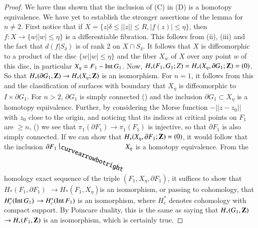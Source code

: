 \begin{proof}
We have thus shown that the inclusion of (C) in (D) is a homotopy equivalence. We have yet to establish the stronger assertions of the lemma for $n \neq 2$. First notice that if $X = \{z | \delta \leqslant ||z|| \leqslant R, |f(z)|\leqslant \eta\}$, then $f:X \to \{w || w| \leqslant \eta\}$ is a differentiable fibration. This follows from (ii), (iii) and the fact that $d(f|S_\delta)$ is of rank 2 on $X \cap S_\delta$. It follows that $X$ is diffeomorphic to a product of the disc $\{w||w|\leqslant \eta\}$ and the fiber $X_w$ of $X$ over any point $w$ of this disc, in particular $X_\eta = F_1 - \operatorname{Int} G_1$. Now, $H_* (F_1, G_1 ; Z) =H_* (X_\eta, \partial G_1; \mathbf{Z}) = (0)$. So that $H_* (\partial G_1, \mathbf{Z}) \to H_* (X_\eta; \mathbf{Z})$ is an isomorphism. For $n=1$, it follows from this and the classification of surfaces with boundary that $X_\eta$ is diffeomorphic to $I \times \partial G_1$. For $n>2$, $\partial G_1$ is simply connected (\cite{art10-key9}) and the inclusion $\partial G_1 \subset X_\eta$ is a homotopy equivalence. Further, by considering the Morse function $-||z-z_0||$ with $z_0$ close to the origin, and noticing that its indices at critical points on $F_1$ are $\geqslant n$, (\cite{art10-key1}) we see that $\pi_1 (\partial F_1) \to \pi_1 (F_1)$ is injective, so that $\partial F_1$ is also simply connected. If we can show that $H_* (X_\eta, \partial F_1; \mathbf{Z}) = (0)$, it would follow that the inclusion $\partial F_1 \raisebox{2pt}{\rotatebox{-20}{$\curvearrowbotright$}}\, X_\eta$ is a homotopy equivalence. From the homology exact sequence of the triple $(F_1, X_\eta, \partial F_1)$, it suffices to show that $H_* (F_1, \partial F_1)$ $\to H_* (F_1, X_\eta)$\pageoriginale is an isomorphism, or passing to cohomology, that $H^*_c (\operatorname{Int} G_1)$ $\to H^*_c (\operatorname{Int} F_1)$ is an isomorphism, where $H^*_c$ denotes cohomology with compact support. By Poincare duality, this is the same as saying that $H_* (G_1, \mathbf{Z})$ $\to H_* (F_1, \mathbf{Z})$ is an isomorphism, which is certainly true.


\end{proof}
